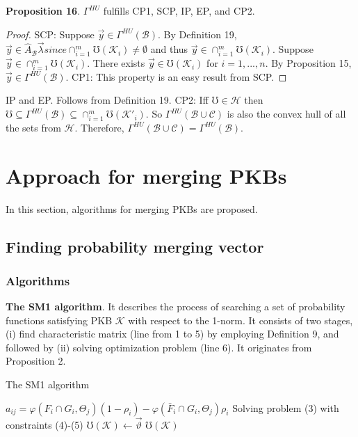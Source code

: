 \documentclass[]{iosart2c}
\begin{document}
\textbf{Proposition 16}. $\Gamma^{HU}$ fulfills CP1, SCP, IP, EP, and CP2.
 
\begin{proof}SCP: Suppose $\vec{y}  \in \Gamma^{HU}(\mathcal{B})$. By Definition
19, $\vec{y} \in \widehat{A}_\mathcal{B}\vec{\lambda} since \cap^m_{i=1}\mho(\mathcal{K}_i) \neq \emptyset$ and thus $\vec{y} \in 
\cap^m_{i=1}\mho(\mathcal{K}_i)$. Suppose $\vec{y} \in \cap^m_{i=1}\mho(\mathcal{K}_i)$. There exists
$\vec{y} \in \mho(\mathcal{K}_i)$ for $i = 1, ... , n$. By Proposition 15, $\vec{y} \in 
\Gamma^{HU}(\mathcal{B})$. CP1: This property is an easy result from
 SCP. 
 \end{proof}
IP and EP. Follows from Definition 19. CP2: Iff $\mho \in 
\mathcal{H}$ then $\mho \subseteq \Gamma^{HU}(\mathcal{B}) \subseteq \cap^m_{i=1}\mho(\mathcal{K}'_i)$. So $\Gamma^{HU}(\mathcal{B} \cup \mathcal{C})$
is also the convex hull of all the sets from $\mathcal{H}$. Therefore, 
$\Gamma^{HU}(\mathcal{B} \cup \mathcal{C}) = \Gamma^{HU}(\mathcal{B})$.

\section{Approach for merging PKBs}

In this section, algorithms for merging PKBs are proposed.

\subsection{Finding probability merging vector}

\subsubsection{Algorithms}

\textbf{The SM1 algorithm}. It describes the process of
searching a set of probability functions satisfying
PKB $\mathcal{K}$ with respect to the 1-norm. It consists of two
stages, (i) find characteristic matrix (line from 1 to 5)
by employing Definition 9, and followed by (ii) solving
optimization problem (line 6). It originates from
Proposition 2.

\begin{algorithm}
\caption{The SM1 algorithm}
\begin{algorithmic}[1]
      \State $a_{ij} = \varphi(F_i \cap G_i,\Theta_j)(1 - \rho_i) - \varphi(\bar{F}_i \cap G_i,\Theta_j )\rho_i$
  \EndFor
\EndFor
\State Solving problem (3) with constraints (4)-(5)
\State $\mho(\mathcal{K}) \gets \vec{\vartheta}$
\State \Return $\mho(\mathcal{K})$
\end{algorithmic}
\end{algorithm}
\end{document}

